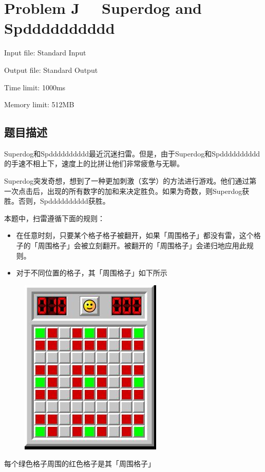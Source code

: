 \newpage
\section{Problem J \ \ Superdog and Spdddddddddd}
{ \limitfont{}
Input file: Standard Input \par
Output file: Standard Output \par
Time limit: 1000ms \par
Memory limit: 512MB \par
}
\subsection*{题目描述}
Superdog和Spdddddddddd最近沉迷扫雷。但是，由于Superdog和Spdddddddddd的手速不相上下，速度上的比拼让他们非常疲惫与无聊。

Superdog突发奇想，想到了一种更加刺激（玄学）的方法进行游戏。他们通过第一次点击后，出现的所有数字的加和来决定胜负。如果为奇数，则Superdog获胜。否则，Spdddddddddd获胜。

本题中，扫雷遵循下面的规则：
\begin{itemize}
    \item 在任意时刻，只要某个格子格子被翻开，如果「周围格子」都没有雷，这个格子的「周围格子」会被立刻翻开。被翻开的「周围格子」会递归地应用此规则。
    \item 对于不同位置的格子，其「周围格子」如下所示
\end{itemize}

\begin{figure}[H]
    \centering
    \includegraphics[scale=0.5]{./src/d1.png}
\end{figure}
每个绿色格子周围的红色格子是其「周围格子」

